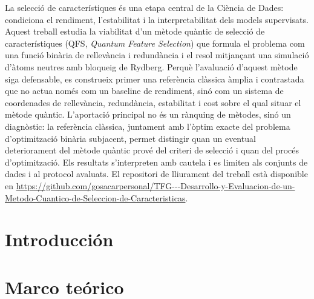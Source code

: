 \documentclass[twoside,spanish,a4paper,12pt]{tfg}
\makeatletter
\renewcommand*{\cleardoublepage}{\clearpage\if@twoside
  \ifodd\c@page\else\hbox{}\thispagestyle{empty}\newpage
  \if@twocolumn\hbox{}\newpage\fi\fi\fi}
\makeatother
\begin{document}
\begin{resum}
  La selecció de característiques és una etapa central de la Ciència de
  Dades: condiciona el rendiment, l'estabilitat i la interpretabilitat
  dels models supervisats. Aquest treball estudia la viabilitat d'un
  mètode quàntic de selecció de característiques (QFS, \textit{Quantum
  Feature Selection}) que formula el problema com una funció binària de
  rellevància i redundància i el resol mitjançant una simulació d'àtoms
  neutres amb bloqueig de Rydberg. Perquè l'avaluació d'aquest mètode
  siga defensable, es construeix primer una referència clàssica àmplia i
  contrastada que no actua només com un baseline de rendiment, sinó com un
  sistema de coordenades de rellevància, redundància, estabilitat i cost
  sobre el qual situar el mètode quàntic. L'aportació principal no és un
  rànquing de mètodes, sinó un diagnòstic: la referència clàssica,
  juntament amb l'òptim exacte del problema d'optimització binària
  subjacent, permet distingir quan un eventual deteriorament del mètode
  quàntic prové del criteri de selecció i quan del procés d'optimització.
  Els resultats s'interpreten amb cautela i es limiten als conjunts de
  dades i al protocol avaluats. El repositori de lliurament del treball
  està disponible en
  \url{https://github.com/gosacarpersonal/TFG---Desarrollo-y-Evaluacion-de-un-Metodo-Cuantico-de-Seleccion-de-Caracteristicas}.
\end{resum}
\cleardoublepage{}


\begin{agradecimientos}
\end{agradecimientos}
\cleardoublepage{}

\tableofcontents

\cleardoublepage{}
\listoffigures

\cleardoublepage{}
\listoftables

\pagestyle{tfg}
\justify{}

\chapter{Introducción}


\chapter{Marco teórico}

\end{document}
